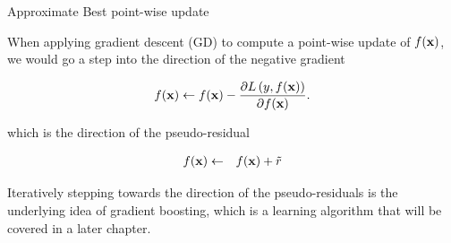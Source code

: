 \documentclass[11pt,compress,t,notes=noshow, xcolor=table]{beamer}
\begin{document}
\begin{vbframe}{Approximate Best point-wise update}

When applying gradient descent (GD) to compute a point-wise update of $f(\mathbf{x})$, we would go a step into the direction of the negative gradient

$$
	f(\mathbf{x}) \leftarrow f(\mathbf{x}) - \frac{\partial L\left(y, f(\mathbf{x})\right)}{\partial f(\mathbf{x})}. 
$$

which is the direction of the pseudo-residual

\begin{eqnarray*}
	f(\mathbf{x}) &\leftarrow& f(\mathbf{x}) + \tilde r\\ 
\end{eqnarray*}

Iteratively stepping towards the direction of the pseudo-residuals is the underlying idea of gradient boosting, which is a learning algorithm that will be covered in a later chapter. 


\end{vbframe}
\end{document}
